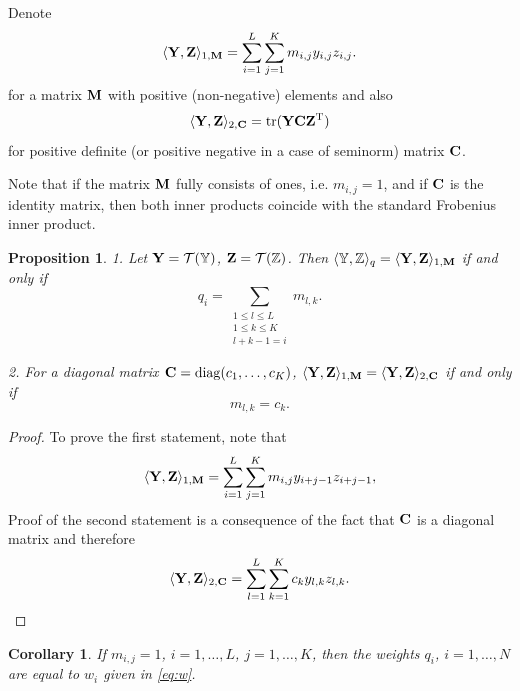 \documentclass[sii]{ipart}
\DeclareMathOperator{\tr}{tr}
\newtheorem{corollary}{Corollary}
\newtheorem{proposition}{Proposition}
\begin{document}
Denote
\begin{equation}
\label{eq:norm1M}
\langle\bfY,\bfZ\rangle_{1,\bfM} = \sum_{i = 1}^L \sum_{j=1}^K m_{i,j} y_{i,j} z_{i,j}.
\end{equation}
for a matrix $\mathbf{M}$ with positive (non-negative) elements and also
\begin{equation}
\label{eq:norm2S}
\langle\bfY,\bfZ\rangle_{2,\bfC} = \tr(\bfY \bfC \bfZ^\rmT)
\end{equation}
for positive definite (or positive negative in a case of seminorm) matrix $\mathbf{C}$.

Note that if the matrix $\mathbf{M}$ fully consists of ones, i.e. $m_{i,j}=1$,
and if $\mathbf{C}$ is the identity matrix, then both inner products coincide with the standard Frobenius inner product.

\begin{proposition}
	\label{prop:equiv_tasks}
	1. Let $\mathbf{Y} = \mathcal{T}(\mathbb{Y})$,  $\mathbf{Z} = \mathcal{T}(\mathbb{Z})$. Then $\langle\mathbb{Y},\mathbb{Z}\rangle_q= \langle \mathbf{Y},\mathbf{Z} \rangle_{1,\mathbf{M}}$ if and only if
	\begin{equation}\label{qi_mi}
	q_i = \sum_{\substack{1 \le l \le L \\ 1 \le k \le K \\ l+k-1=i}} m_{l,k}.
	\end{equation}
	
	2. For a diagonal matrix $\mathbf{C}=\mathop{\mathrm{diag}}(c_1,\ldots,c_K)$, $\langle\mathbf{Y},\mathbf{Z}\rangle_{1,\mathbf{M}}= \langle\mathbf{Y},\mathbf{Z}\rangle_{2,\mathbf{C}}$ if and only if
	\begin{equation}\label{sk_mlk}
	m_{l,k}=c_k.
	\end{equation}
\end{proposition}
\begin{proof}
	To prove the first statement, note that
	\begin{equation*}
	\langle \bfY, \bfZ \rangle_{1,\bfM} = \sum_{i = 1}^L \sum_{j = 1}^K m_{i,j} y_{i + j - 1} z_{i + j - 1},
	\end{equation*}
	Proof of the second statement is a consequence of the fact that $\mathbf{C}$ is a diagonal matrix and therefore
	\begin{equation*}
	\langle \bfY, \bfZ \rangle_{2,\bfC} = \sum_{l=1}^L \sum_{k=1}^K c_k y_{l,k} z_{l, k}.
	\end{equation*}
\end{proof}

\begin{corollary}
	\label{cor:base_weights}
	If $m_{i,j}=1$, $i =1, \ldots, L$, $j = 1, \ldots, K$, then the weights $q_i$, $i = 1, \ldots, N$ are equal to $w_i$ given in \eqref{eq:w}.
\end{corollary}
\end{document}
